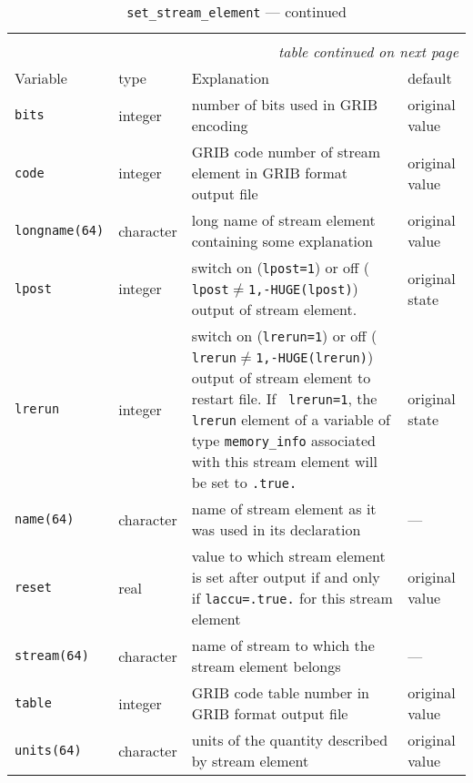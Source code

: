 \begin{longtable}{l@{\extracolsep\fill}lp{7cm}p{3.5cm}}\hline\hline
\caption[Namelist {\tt set\_stream\_element}]{Namelist 
  {\tt set\_stream\_element}}\\\hline\label{tabset_stream_element}
\endfirsthead
\caption[]{{\tt set\_stream\_element} --- continued}\\\hline
\endhead
\hline\multicolumn{4}{r}{\slshape table continued on next page}\\
\endfoot
\hline %
\endlastfoot
Variable & type & Explanation & default \\\hline
{\tt bits}\index{namelist variables!bits}
 & integer & number of bits used in GRIB encoding & original
value\\
{\tt code}\index{namelist variables!code}
 & integer & GRIB code number of stream element in GRIB format
output file & original value \\
{\tt longname(64)}\index{namelist variables!longname}
 & character & long name of stream element
containing some explanation & original value \\ 
{\tt lpost}\index{namelist variables!lpost}
 & integer & switch on ({\tt lpost=1}) or off ({\tt
  lpost$\neq$1,-HUGE(lpost)}) output of stream element.  & original state  \\
{\tt lrerun}\index{namelist variables!lrerun}
 & integer & switch on ({\tt lrerun=1}) or off ({\tt
  lrerun$\neq$1,-HUGE(lrerun)}) output of stream element to restart
file. If {\tt 
  lrerun=1}, the {\tt 
  lrerun} element of a variable of type {\tt memory\_info} associated
with this stream element will be set
to {\tt .true.} & original state  \\
{\tt name(64)}\index{namelist variables!name}
 & character & name of stream element as it was used in
its declaration & --- \\ 
{\tt reset}\index{namelist variables!reset}
 & real & value to which stream element is set after output
if and only if {\tt laccu=.true.} for this stream element & original value \\
{\tt stream(64)}\index{namelist variables!stream}
 & character &name of stream to which the stream
element belongs & --- \\
{\tt table}\index{namelist variables!table}
 & integer & GRIB code table number in GRIB format output
file & original value \\
{\tt units(64)}\index{namelist variables!units}
 & character & units of the quantity described by stream
element  & original value \\ 
\hline
\end{longtable}


